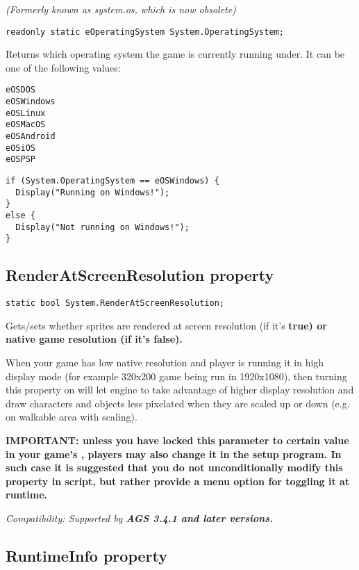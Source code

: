 \it{(Formerly known as system.os, which is now obsolete)}

\begin{verbatim}
readonly static eOperatingSystem System.OperatingSystem;
\end{verbatim}
Returns which operating system the game is currently running under. It can be one of
the following values:
\begin{verbatim}
eOSDOS
eOSWindows
eOSLinux
eOSMacOS
eOSAndroid
eOSiOS
eOSPSP
\end{verbatim}

\begin{verbatim}
if (System.OperatingSystem == eOSWindows) {
  Display("Running on Windows!");
}
else {
  Display("Not running on Windows!");
}
\end{verbatim}


\subsection{RenderAtScreenResolution property}\label{System.RenderAtScreenResolution}%

\begin{verbatim}
static bool System.RenderAtScreenResolution;
\end{verbatim}
Gets/sets whether sprites are rendered at screen resolution (if it's \bf{true}) or native game resolution (if it's \bf{false}).

When your game has low native resolution and player is running it in high display mode (for example 320x200 game being run in 1920x1080), then turning this property on will let engine to take advantage of higher display resolution and draw characters and objects less pixelated when they are scaled up or down (e.g. on walkable area with scaling).

\bf{IMPORTANT:} unless you have locked this parameter to certain value in your game's , players may also change it in the setup program. In such case it is suggested that you do not unconditionally modify this property in script, but rather provide a menu option for toggling it at runtime.

\it{Compatibility:} Supported by \bf{AGS 3.4.1} and later versions.


\subsection{RuntimeInfo property}\label{System.RuntimeInfo}%

